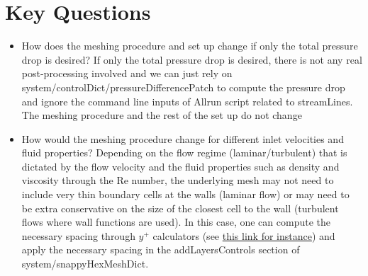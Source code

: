 \documentclass[10pt,letterpaper]{article}
\newcommand{\mfont}[1]{{\fontfamily{qcr}\selectfont #1}}
\begin{document}
\section*{Key Questions}
\noindent
\begin{itemize}
	\item How does the meshing procedure and set up change if only the total pressure drop is
	desired?
	{
		\color{mblue}
		If only the total pressure drop is desired, there is not any real post-processing involved and we can just rely on \mfont{system\slash controlDict\slash pressureDifferencePatch} to compute the pressure drop and ignore the command line inputs of \mfont{Allrun} script related to streamLines. The meshing procedure and the rest of the set up do not change
	}
	\item  How would the meshing procedure change for different inlet velocities and fluid
	properties?
		{
		\color{mblue}
	Depending on the flow regime (laminar/turbulent)  that is dictated by the flow velocity and the fluid properties such as density and viscosity through the Re number, the underlying mesh may not need to include very thin boundary cells at the walls (laminar flow) or may need to be extra conservative on the size of the closest cell to the wall (turbulent flows where wall functions are used). In this case, one can compute the necessary spacing through $y^+$ calculators (see \href{https://www.pointwise.com/yplus/}{this link  for instance}) and apply the necessary spacing in the \mfont{addLayersControls} section of \mfont{system\slash snappyHexMeshDict}.
	}


\end{itemize}
\end{document}
